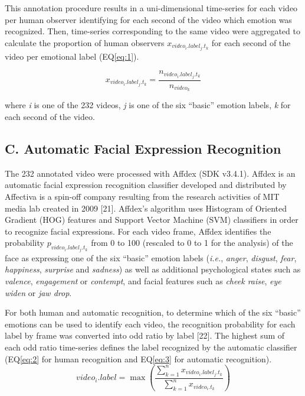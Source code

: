 \documentclass[conference,final,]{IEEEtran}
\begin{document}
This annotation procedure results in a uni-dimensional time-series for
each video per human observer identifying for each second of the video
which emotion was recognized. Then, time-series corresponding to the
same video were aggregated to calculate the proportion of human
observers \(x_{video_{i}.label_{j}.t_{k}}\) for each second of the video
per emotional label (EQ\ref{eq:1}).

\begin{equation}
\label{eq:1}
x_{video_{i}.label_{j}.t_{k}} = \frac{n_{video_{i}.label_{j}.t_{k}}}{n_{video_{k}}}
\end{equation}

where \emph{i} is one of the 232 videos, \emph{j} is one of the six
``basic'' emotion labels, \emph{k} for each second of the video.

\hypertarget{c.-automatic-facial-expression-recognition}{%
\subsection{C. Automatic Facial Expression
Recognition}\label{c.-automatic-facial-expression-recognition}}

The 232 annotated video were processed with Affdex (SDK v3.4.1). Affdex
is an automatic facial expression recognition classifier developed and
distributed by Affectiva is a spin-off company resulting from the
research activities of MIT media lab created in 2009 {[}21{]}. Affdex's
algorithm uses Histogram of Oriented Gradient (HOG) features and Support
Vector Machine (SVM) classifiers in order to recognize facial
expressions. For each video frame, Affdex identifies the probability
\(p_{video_{i}.label_{j}.t_{k}}\) from 0 to 100 (rescaled to 0 to 1 for
the analysis) of the face as expressing one of the six ``basic'' emotion
labels (\emph{i.e.}, \emph{anger}, \emph{disgust}, \emph{fear},
\emph{happiness}, \emph{surprise} and \emph{sadness}) as well as
additional psychological states such as \emph{valence},
\emph{engagement} or \emph{contempt}, and facial features such as
\emph{cheek raise}, \emph{eye widen} or \emph{jaw drop}.

For both human and automatic recognition, to determine which of the six
``basic'' emotions can be used to identify each video, the recognition
probability for each label by frame was converted into odd ratio by
label {[}22{]}. The highest sum of each odd ratio time-series defines
the label recognized by the automatic classifier (EQ\ref{eq:2} for human
recognition and EQ\ref{eq:3} for automatic recognition).
\begin{equation}
\label{eq:2}
video_{i}.label = \max\left(\frac{\sum_{k=1}^{n}x_{video_{i}.label_{j}.t_{k}}}{\sum_{k=1}^{n}x_{video_{i}.t_{k}}}\right)
\end{equation}
\end{document}
